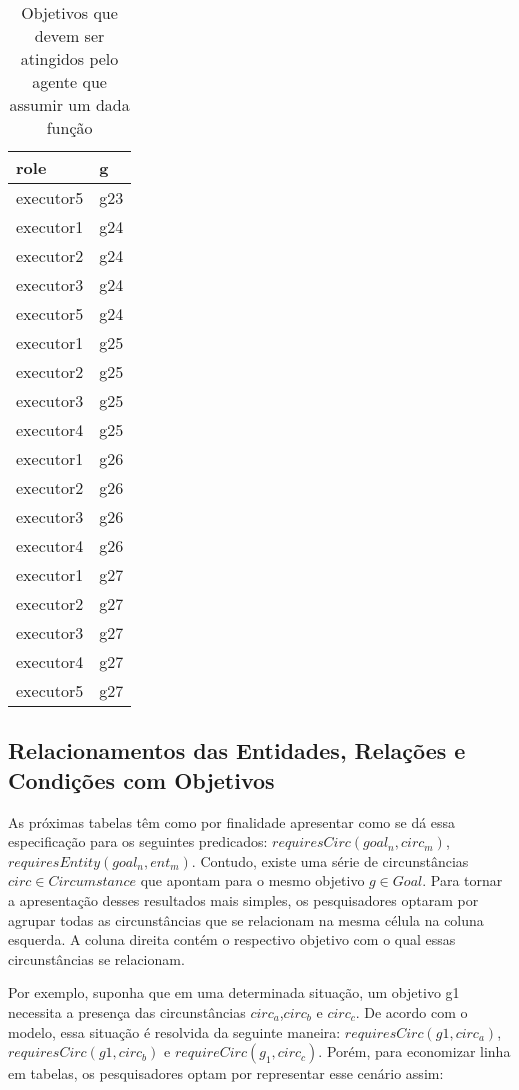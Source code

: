 \begin{table}[H]
\centering
{}
\begin{tabular}{|l|l|}
\hline
\textbf{role} & \textbf{g} \\ \hline
executor5 & g23 \\ \hline
executor1 & g24 \\ \hline
executor2 & g24 \\ \hline
executor3 & g24 \\ \hline
executor5 & g24 \\ \hline
executor1 & g25 \\ \hline
executor2 & g25 \\ \hline
executor3 & g25 \\ \hline
executor4 & g25 \\ \hline
executor1 & g26 \\ \hline
executor2 & g26 \\ \hline
executor3 & g26 \\ \hline
executor4 & g26 \\ \hline
executor1 & g27 \\ \hline
executor2 & g27 \\ \hline
executor3 & g27 \\ \hline
executor4 & g27 \\ \hline
executor5 & g27 \\ \hline
\end{tabular}
\caption{Objetivos que devem ser atingidos pelo agente que assumir um dada função}
\label{deontic4}
\end{table}

\subsection{Relacionamentos das Entidades, Relações e Condições com Objetivos}

As próximas tabelas têm como por finalidade apresentar como se dá essa especificação para os seguintes predicados: $requiresCirc(goal_n, circ_m)$,$requiresEntity(goal_n, ent_m)$. Contudo, existe uma série de circunstâncias $circ \in Circumstance$ que apontam para o mesmo objetivo $g \in Goal$. Para tornar a apresentação desses resultados mais simples, os pesquisadores optaram por agrupar todas as circunstâncias que se relacionam na mesma célula na coluna esquerda. A coluna direita contém o respectivo objetivo com o qual essas circunstâncias se relacionam.

Por exemplo, suponha que em uma determinada situação, um objetivo g1 necessita a presença das circunstâncias $circ_a$,$circ_b$ e $circ_c$. De acordo com o modelo, essa situação é resolvida da seguinte maneira: $requiresCirc(g1,circ_a)$, $requiresCirc(g1,circ_b)$ e $requireCirc(g_1,circ_c)$. Porém, para economizar linha em tabelas, os pesquisadores optam por representar esse cenário assim:

